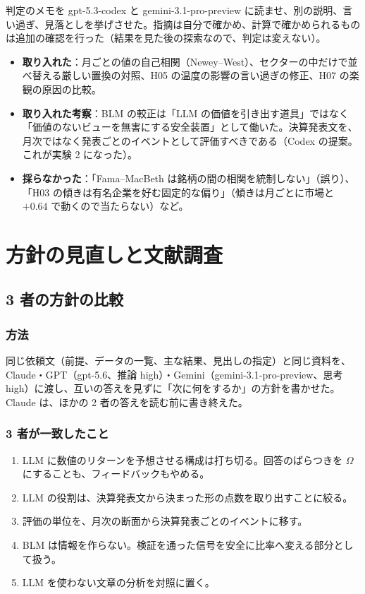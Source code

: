 \documentclass[xelatex,ja=standard,jafont=haranoaji,a4paper,10pt]{bxjsreport}
\begin{document}
判定のメモを gpt-5.3-codex と gemini-3.1-pro-preview に読ませ、別の説明、言い過ぎ、見落としを挙げさせた。指摘は自分で確かめ、計算で確かめられるものは追加の確認を行った（結果を見た後の探索なので、判定は変えない）。

\begin{itemize}
\item \textbf{取り入れた}：月ごとの値の自己相関（Newey--West）、セクターの中だけで並べ替える厳しい置換の対照、H05 の温度の影響の言い過ぎの修正、H07 の楽観の原因の比較。
\item \textbf{取り入れた考察}：BLM の較正は「LLM の価値を引き出す道具」ではなく「価値のないビューを無害にする安全装置」として働いた。決算発表文を、月次ではなく発表ごとのイベントとして評価すべきである（Codex の提案。これが実験 2 になった）。
\item \textbf{採らなかった}：「Fama--MacBeth は銘柄の間の相関を統制しない」（誤り）、「H03 の傾きは有名企業を好む固定的な偏り」（傾きは月ごとに市場と $+0.64$ で動くので当たらない）など。
\end{itemize}

\part{方針の見直しと文献調査}

\chapter{3 者の方針の比較}\label{ch:policy}

\section{方法}

同じ依頼文（前提、データの一覧、主な結果、見出しの指定）と同じ資料を、Claude・GPT（gpt-5.6、推論 high）・Gemini（gemini-3.1-pro-preview、思考 high）に渡し、互いの答えを見ずに「次に何をするか」の方針を書かせた。Claude は、ほかの 2 者の答えを読む前に書き終えた。

\section{3 者が一致したこと}

\begin{enumerate}
\item LLM に数値のリターンを予想させる構成は打ち切る。回答のばらつきを $\Omega$ にすることも、フィードバックもやめる。
\item LLM の役割は、決算発表文から決まった形の点数を取り出すことに絞る。
\item 評価の単位を、月次の断面から決算発表ごとのイベントに移す。
\item BLM は情報を作らない。検証を通った信号を安全に比率へ変える部分として扱う。
\item LLM を使わない文章の分析を対照に置く。
\end{enumerate}
\end{document}

